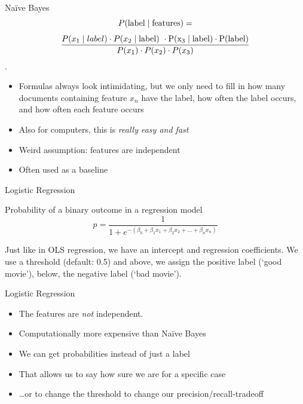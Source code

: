 \documentclass[compress]{beamer}
\begin{document}
\begin{frame}{Na\"ive Bayes}
$$ P(\rm{label} \mid \rm{features}) =$$
$$ \frac{P(x_1 \mid label) \cdot P(x_2 \mid \rm{label})\ \cdot P(x_3 \mid label) \cdot P(label)}{P(x_1) \cdot P(x_2) \cdot P(x_3)}$$.

	
\begin{itemize}
	\item Formulas always look intimidating, but we only need to fill in how many documents containing feature $x_n$ have the label, how often the label occurs, and how often each feature occurs
	\item Also for computers, this is \emph{really easy and fast}
	\item Weird assumption: features are independent
	\item Often used as a baseline
\end{itemize}
\end{frame}




\begin{frame}{Logistic Regression}
	\begin{block}{Probability of a binary outcome in a regression model}
		$$p = \frac{1}{1 + e^{-(\beta_0 + \beta_1 x_1 + \beta_2 x_2 + \ldots + \beta_n x_n)}}$$
	\end{block}
	Just like in OLS regression, we have an intercept and regression coefficients. 
	We use a threshold (default: 0.5) and above, we assign the positive label (`good movie'), below, the negative label (`bad movie').
\end{frame}
\begin{frame}{Logistic Regression}
	\begin{itemize}[<+->]
		\item The features are \emph{not} independent.
		\item Computationally more expensive than Naïve Bayes
		\item We can get probabilities instead of just a label
		\item That allows us to say how sure we are for a specific case
		\item \ldots or to change the threshold to change our precision/recall-tradeoff
	\end{itemize}
\end{frame}
\end{document}
